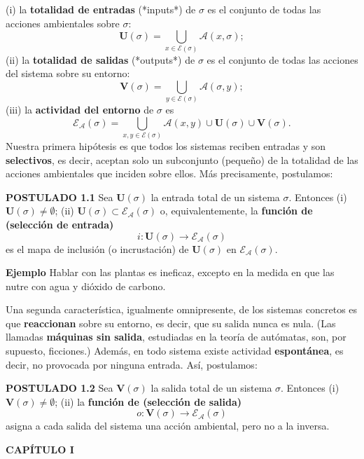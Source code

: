 {\fontsize{13}{15}\selectfont
(i) la \textbf{totalidad de entradas} (*inputs*) de $\sigma$ es el conjunto de todas las acciones ambientales sobre $\sigma$:
$$ \mathbf{U}(\sigma) = \bigcup_{x \in \mathcal{E}(\sigma)} \mathcal{A}(x, \sigma); $$
(ii) la \textbf{totalidad de salidas} (*outputs*) de $\sigma$ es el conjunto de todas las acciones del sistema sobre su entorno:
$$ \mathbf{V}(\sigma) = \bigcup_{y \in \mathcal{E}(\sigma)} \mathcal{A}(\sigma, y); $$
(iii) la \textbf{actividad del entorno} de $\sigma$ es
$$ \mathcal{E}_{\mathcal{A}}(\sigma) = \bigcup_{x, y \in \mathcal{E}(\sigma)} \mathcal{A}(x, y) \cup \mathbf{U}(\sigma) \cup \mathbf{V}(\sigma). $$
Nuestra primera hipótesis es que todos los sistemas reciben entradas y son \textbf{selectivos}, es decir, aceptan solo un subconjunto (pequeño) de la totalidad de las acciones ambientales que inciden sobre ellos. Más precisamente, postulamos:

\textbf{POSTULADO 1.1} Sea $\mathbf{U}(\sigma)$ la entrada total de un sistema $\sigma$. Entonces
(i) $\mathbf{U}(\sigma) \neq \emptyset$;
(ii) $\mathbf{U}(\sigma) \subset \mathcal{E}_{\mathcal{A}}(\sigma)$ o, equivalentemente, la \textbf{función de (selección de entrada)}
$$ i: \mathbf{U}(\sigma) \longrightarrow \mathcal{E}_{\mathcal{A}}(\sigma) $$
es el mapa de inclusión (o incrustación) de $\mathbf{U}(\sigma)$ en $\mathcal{E}_{\mathcal{A}}(\sigma)$.

\textbf{Ejemplo} Hablar con las plantas es ineficaz, excepto en la medida en que las nutre con agua y dióxido de carbono.

Una segunda característica, igualmente omnipresente, de los sistemas concretos es que \textbf{reaccionan} sobre su entorno, es decir, que su salida nunca es nula. (Las llamadas \textbf{máquinas sin salida}, estudiadas en la teoría de autómatas, son, por supuesto, ficciones.) Además, en todo sistema existe actividad \textbf{espontánea}, es decir, no provocada por ninguna entrada. Así, postulamos:

\textbf{POSTULADO 1.2} Sea $\mathbf{V}(\sigma)$ la salida total de un sistema $\sigma$. Entonces
(i) $\mathbf{V}(\sigma) \neq \emptyset$;
(ii) la \textbf{función de (selección de salida)}
$$ o: \mathbf{V}(\sigma) \longrightarrow \mathcal{E}_{\mathcal{A}}(\sigma) $$
asigna a cada salida del sistema una acción ambiental, pero no a la inversa.
}

\newpage
\fancyhf{}
\fancyhead[l]{\thepage}
\begin{center}
{\fontsize{13}{16}\selectfont \textbf{CAPÍTULO I}}
\end{center}
\vspace{0.5cm}

